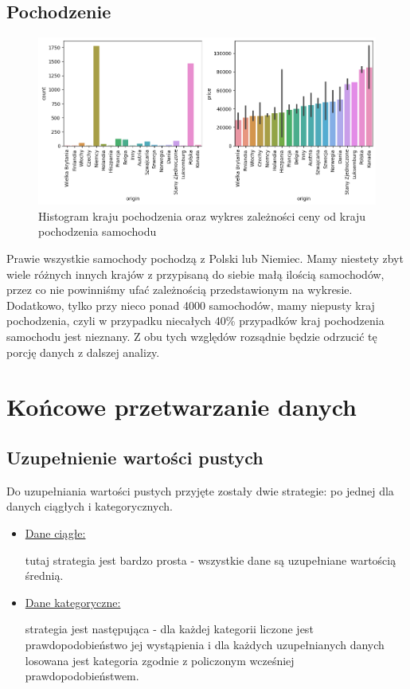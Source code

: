 \documentclass{article}
\begin{document}
\subsection{Pochodzenie}
\begin{figure}[H]
    \centering
    \includegraphics[width=1\linewidth]{images/kraj_pochodzenia.png}
    \caption{Histogram kraju pochodzenia oraz wykres zależności ceny od kraju pochodzenia samochodu}
    \label{plt:origin}
\end{figure}
Prawie wszystkie samochody pochodzą z Polski lub Niemiec. Mamy niestety zbyt wiele różnych innych krajów z przypisaną do siebie małą ilością samochodów, przez co nie powinniśmy ufać zależnością przedstawionym na wykresie. Dodatkowo, tylko przy nieco ponad 4000 samochodów, mamy niepusty kraj pochodzenia, czyli w przypadku niecałych 40\% przypadków kraj pochodzenia samochodu jest nieznany. Z obu tych względów rozsądnie będzie odrzucić tę porcję danych z dalszej analizy.

\section{Końcowe przetwarzanie danych}
\subsection{Uzupełnienie wartości pustych}
Do uzupełniania wartości pustych przyjęte zostały dwie strategie: po jednej dla danych ciągłych i kategorycznych.
\begin{itemize}
    \item \underline{Dane ciągłe:}

    tutaj strategia jest bardzo prosta - wszystkie dane są uzupełniane wartością średnią.

    \item \underline{Dane kategoryczne:}
    
    strategia jest następująca - dla każdej kategorii liczone jest prawdopodobieństwo jej wystąpienia i dla każdych uzupełnianych danych losowana jest kategoria zgodnie z policzonym wcześniej prawdopodobieństwem.
    
\end{itemize}
\end{document}
